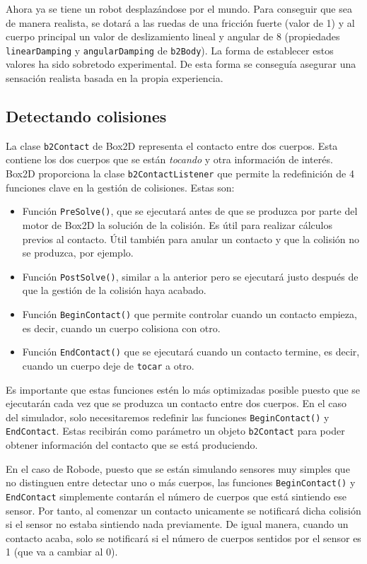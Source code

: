 Ahora ya se tiene un robot desplazándose por el mundo. Para conseguir que sea de manera realista, se dotará a las ruedas de una fricción fuerte (valor de 1) y al cuerpo principal un valor de deslizamiento lineal y angular de 8 (propiedades \texttt{linearDamping} y \texttt{angularDamping} de \texttt{b2Body}).{\color{red} La forma de establecer estos valores ha sido sobretodo experimental. De esta forma se conseguía asegurar una sensación realista basada en la propia experiencia.}


\subsection{Detectando colisiones}
\label{detectando-colisiones}

La clase \texttt{b2Contact} de Box2D representa el contacto entre dos cuerpos. Esta contiene los dos cuerpos que se están \emph{tocando} y otra información de interés. Box2D proporciona la clase \texttt{b2ContactListener} que permite la redefinición de 4 funciones clave en la gestión de colisiones. Estas son:

\begin{itemize}
	\item Función \texttt{PreSolve()}, que se ejecutará antes de que se produzca por parte del motor de Box2D la solución de la colisión. Es útil para realizar cálculos previos al contacto. Útil también para anular un contacto y que la colisión no se produzca, por ejemplo.
	\item Función \texttt{PostSolve()}, similar a la anterior pero se ejecutará justo después de que la gestión de la colisión haya acabado.
	\item Función \texttt{BeginContact()} que permite controlar cuando un contacto empieza, es decir, cuando un cuerpo colisiona con otro. 
	\item Función \texttt{EndContact()} que se ejecutará cuando un contacto termine, es decir, cuando un cuerpo deje de \texttt{tocar} a otro.
\end{itemize}

Es importante que estas funciones estén lo más optimizadas posible puesto que se ejecutarán cada vez que se produzca un contacto entre dos cuerpos. En el caso del simulador, solo necesitaremos redefinir las funciones \texttt{BeginContact()} y  \texttt{EndContact}. Estas recibirán como parámetro un objeto \texttt{b2Contact} para poder obtener información del contacto que se está produciendo.

En el caso de Robode, puesto que se están simulando sensores muy simples que no distinguen entre detectar uno o más cuerpos, las funciones \texttt{BeginContact()} y \texttt{EndContact} simplemente contarán el número de cuerpos que está sintiendo ese sensor. Por tanto, al comenzar un contacto unicamente se notificará dicha colisión si el sensor no estaba sintiendo nada previamente. De igual manera, cuando un contacto acaba, solo se notificará si el número de cuerpos sentidos por el sensor es 1 (que va a cambiar al 0).

